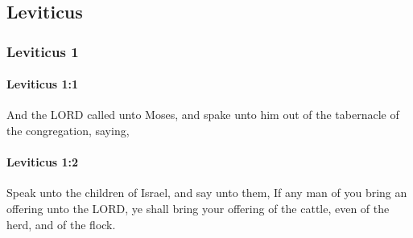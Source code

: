 \subsection{Leviticus}
	\label{LEVITICUS}

	\subsubsection{Leviticus 1} %
		\label{LEVITICUS-1}

		\paragraph{Leviticus 1:1} %
			\label{LEVITICUS-1-1}

			And the LORD called unto Moses, and spake unto him out of the tabernacle of the congregation, saying,


		\paragraph{Leviticus 1:2} %
			\label{LEVITICUS-1-2}

			Speak unto the children of Israel, and say unto them, If any man of you bring an offering unto the LORD, ye shall bring your offering of the cattle, even of the herd, and of the flock.

